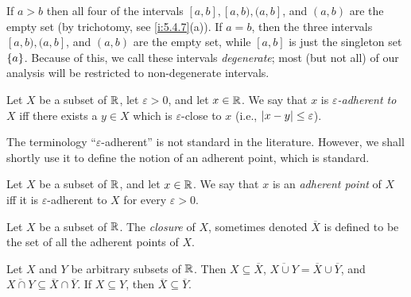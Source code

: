 \begin{eg}\label{i:9.1.4}
  If \(a > b\) then all four of the intervals \([a, b], [a, b), (a, b]\), and \((a, b)\) are the empty set (by trichotomy, see \cref{i:5.4.7}(a)).
  If \(a = b\), then the three intervals \([a, b), (a, b]\), and \((a, b)\) are the empty set, while \([a, b]\) is just the singleton set \(\left\lbrace a\right\rbrace\).
  Because of this, we call these intervals \emph{degenerate};
  most (but not all) of our analysis will be restricted to non-degenerate intervals.
\end{eg}

\begin{defn}\label{i:9.1.5}
  Let \(X\) be a subset of \(\mathbb{R}\), let \(\varepsilon > 0\), and let \(x \in \mathbb{R}\).
  We say that \(x\) is \emph{\(\varepsilon\)-adherent to \(X\)} iff there exists a \(y \in X\) which is \(\varepsilon\)-close to \(x\)
  (i.e., \(\left\lvert x - y\right\rvert \leq \varepsilon\)).
\end{defn}

\begin{rmk}\label{i:9.1.6}
  The terminology ``\(\varepsilon\)-adherent'' is not standard in the literature.
  However, we shall shortly use it to define the notion of an adherent point, which is standard.
\end{rmk}

\setcounter{thm}{7}
\begin{defn}\label{i:9.1.8}
  Let \(X\) be a subset of \(\mathbb{R}\), and let \(x \in \mathbb{R}\).
  We say that \(x\) is an \emph{adherent point} of \(X\) iff it is \(\varepsilon\)-adherent to \(X\) for every \(\varepsilon > 0\).
\end{defn}

\setcounter{thm}{9}
\begin{defn}[Closure]\label{i:9.1.10}
  Let \(X\) be a subset of \(\mathbb{R}\).
  The \emph{closure} of \(X\), sometimes denoted \(\overline{X}\) is defined to be the set of all the adherent points of \(X\).
\end{defn}

\begin{lem}\label{i:9.1.11}
  Let \(X\) and \(Y\) be arbitrary subsets of \(\mathbb{R}\).
  Then \(X \subseteq \overline{X}\), \(\overline{X \cup Y} = \overline{X} \cup \overline{Y}\), and \(\overline{X \cap Y} \subseteq \overline{X} \cap \overline{Y}\).
  If \(X \subseteq Y\), then \(\overline{X} \subseteq \overline{Y}\).
\end{lem}

